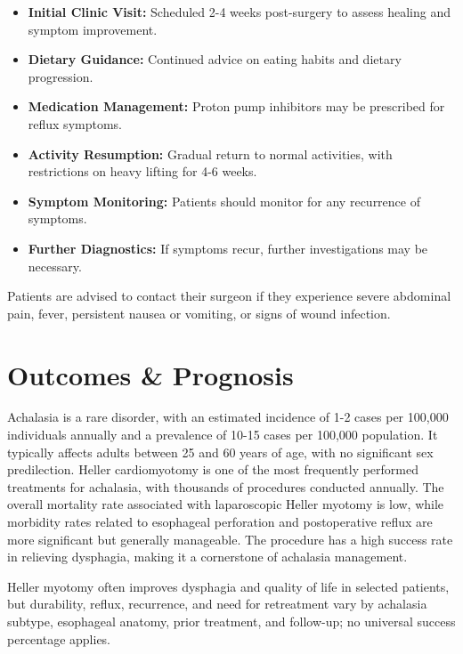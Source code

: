 \begin{itemize}
  \item \textbf{Initial Clinic Visit:} Scheduled 2-4 weeks post-surgery to assess healing and symptom improvement.
  \item \textbf{Dietary Guidance:} Continued advice on eating habits and dietary progression.
  \item \textbf{Medication Management:} Proton pump inhibitors may be prescribed for reflux symptoms.
  \item \textbf{Activity Resumption:} Gradual return to normal activities, with restrictions on heavy lifting for 4-6 weeks.
  \item \textbf{Symptom Monitoring:} Patients should monitor for any recurrence of symptoms.
  \item \textbf{Further Diagnostics:} If symptoms recur, further investigations may be necessary.
\end{itemize}

Patients are advised to contact their surgeon if they experience severe abdominal pain, fever, persistent nausea or vomiting, or signs of wound infection.

\section*{Outcomes \& Prognosis}
Achalasia is a rare disorder, with an estimated incidence of 1-2 cases per 100,000 individuals annually and a prevalence of 10-15 cases per 100,000 population. It typically affects adults between 25 and 60 years of age, with no significant sex predilection. Heller cardiomyotomy is one of the most frequently performed treatments for achalasia, with thousands of procedures conducted annually. The overall mortality rate associated with laparoscopic Heller myotomy is low, while morbidity rates related to esophageal perforation and postoperative reflux are more significant but generally manageable. The procedure has a high success rate in relieving dysphagia, making it a cornerstone of achalasia management.

Heller myotomy often improves dysphagia and quality of life in selected patients, but durability, reflux, recurrence, and need for retreatment vary by achalasia subtype, esophageal anatomy, prior treatment, and follow-up; no universal success percentage applies.

